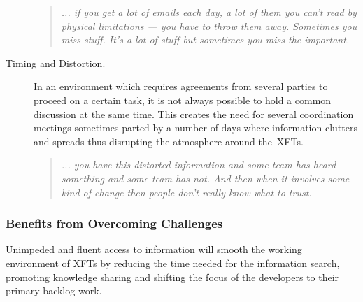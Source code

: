 \begin{description}
      \begin{quote}\itshape ... if you get a lot of emails each day, a lot of them you can’t read by physical limitations — you have to throw them away. Sometimes you miss stuff. It’s a lot of stuff but sometimes you miss the important.
      \end{quote}

   \item[Timing and Distortion.] In an environment which requires agreements from several parties to proceed on a certain task, it is not always possible to hold a common discussion at the same time. This creates the need for several coordination meetings sometimes parted by a number of days where information clutters and spreads thus disrupting the atmosphere around the~\acp{XFT}.
      
      \begin{quote}\itshape ... you have this distorted information and some team has heard something and some team has not. And then when it involves some kind of change then people don't really know what to trust.
      \end{quote}

\end{description}

\subsubsection{Benefits from Overcoming Challenges}

Unimpeded and fluent access to information will smooth the working environment of \acp{XFT} by reducing the time needed for the information search, promoting knowledge sharing and shifting the focus of the developers to their primary backlog work.

